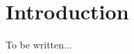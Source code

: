 \documentclass[11pt]{article}
\begin{document}
\maketitle
\thispagestyle{plain}

\section{Introduction}
To be written...

\newpage


\end{document}
